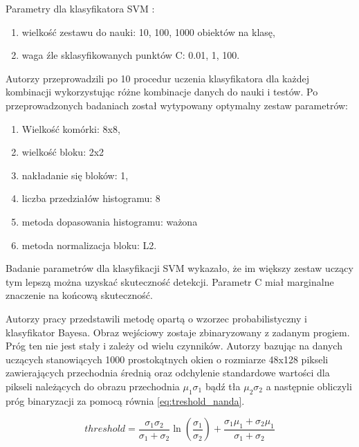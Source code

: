 Parametry dla klasyfikatora SVM :
\begin{enumerate}
\item wielkość zestawu do nauki: 10, 100, 1000 obiektów na klasę,
\item waga źle sklasyfikowanych punktów C: 0.01, 1, 100.
\end{enumerate}
Autorzy przeprowadzili po 10 procedur uczenia klasyfikatora dla każdej kombinacji wykorzystując różne kombinacje danych do nauki i testów. 
Po przeprowadzonych badaniach został wytypowany optymalny zestaw parametrów:
\begin{enumerate}
\item Wielkość komórki: 8x8, 
\item wielkość bloku: 2x2
\item nakładanie się bloków: 1,
\item liczba przedziałów histogramu: 8
\item metoda dopasowania histogramu: ważona 
\item metoda normalizacja bloku: L2.
\end{enumerate}
Badanie parametrów dla klasyfikacji SVM wykazało, że im większy zestaw uczący tym lepszą można uzyskać skuteczność detekcji. 
Parametr C miał marginalne znaczenie na końcową skuteczność.



Autorzy pracy \cite{nanda_2002} przedstawili metodę opartą o wzorzec probabilistyczny i klasyfikator Bayesa. 
Obraz wejściowy zostaje zbinaryzowany z zadanym progiem. 
Próg ten nie jest stały i zależy od wielu czynników. %
Autorzy bazując na danych uczących stanowiących 1000 prostokątnych okien o rozmiarze 48x128 pikseli zawierających przechodnia średnią oraz odchylenie standardowe wartości dla pikseli należących do obrazu przechodnia \( \mu_1 \sigma_1 \) bądź tła \( \mu_2 \sigma_2 \) a następnie obliczyli próg binaryzacji za pomocą równia \ref{eq:treshold_nanda}. %

\begin{equation} \label{eq:treshold_nanda}
threshold = \frac{\sigma_1 \sigma_2}{ \sigma_1 + \sigma_2} \ln\left ( \frac{\sigma_1}{\sigma_2} \right ) + \frac{\sigma_1\mu_1 + \sigma_2\mu_1}{\sigma_1+\sigma_2}\end{equation}

